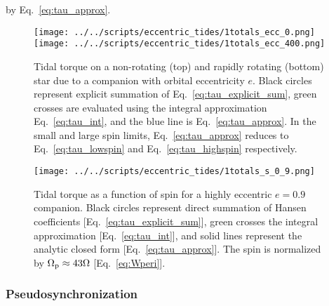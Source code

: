 \documentclass[
        fleqn,
        usenatbib,
    ]{mnras}
\begin{document}
by Eq.~\eqref{eq:tau_approx}.
\begin{figure}
    \centering
    \texttt{[image: ../../scripts/eccentric\_tides/1totals\_ecc\_0.png]}
    \texttt{[image: ../../scripts/eccentric\_tides/1totals\_ecc\_400.png]}
    \caption{Tidal torque on a non-rotating (top) and rapidly rotating (bottom)
    star due to a companion with orbital eccentricity $e$. Black circles
    represent explicit summation of Eq.~\eqref{eq:tau_explicit_sum}, green
    crosses are evaluated using the integral approximation
    Eq.~\eqref{eq:tau_int}, and the blue line is Eq.~\eqref{eq:tau_approx}. In
    the small and large spin limits, Eq.~\eqref{eq:tau_approx} reduces to
    Eq.~\eqref{eq:tau_lowspin} and Eq.~\eqref{eq:tau_highspin} respectively.
    }\label{fig:totals_ecc0}
\end{figure}
\begin{figure}
    \centering
    \texttt{[image: ../../scripts/eccentric\_tides/1totals\_s\_0\_9.png]}
    \caption{Tidal torque as a function of spin for a highly eccentric $e = 0.9$
    companion. Black circles represent direct summation of Hansen coefficients
    [Eq.~\eqref{eq:tau_explicit_sum}], green crosses the integral approximation
    [Eq.~\eqref{eq:tau_int}], and solid lines represent the analytic closed form
    [Eq.~\eqref{eq:tau_approx}]. The spin is normalized by $\Omega_{\rm p}
    \approx 43 \Omega$ [Eq.~\eqref{eq:Wperi}]. }\label{fig:totals_s}
\end{figure}

\subsubsection{Pseudosynchronization}
\end{document}
